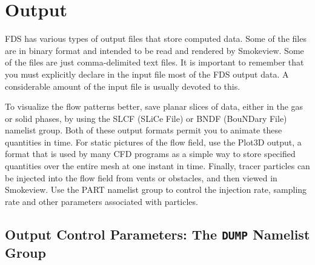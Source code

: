 \documentclass[11pt]{book}
\begin{document}




\chapter{Output}
\label{info:outputdata}

FDS has various types of output files that store computed data. Some of the files are in binary format and intended to be read and rendered by Smokeview. Some of the files are just comma-delimited text files. It is important to remember that you must explicitly declare in the input file most of the FDS output data. A considerable amount of the input file is usually devoted to this.

To visualize the flow patterns better, save planar slices of data, either in the gas or solid phases, by using the {\ct SLCF} (SLiCe File) or {\ct BNDF} (BouNDary File) namelist group. Both of these output formats permit you to animate these quantities in time. For static pictures of the flow field, use the Plot3D output, a format that is used by many CFD programs as a simple way to store specified quantities over the entire mesh at one instant in time. Finally, tracer particles can be injected into the flow field from vents or obstacles, and then viewed in Smokeview. Use the {\ct PART} namelist group to control the injection rate, sampling rate and other parameters associated with particles.


\section{Output Control Parameters: The \texorpdfstring{{\tt DUMP}}{DUMP} Namelist Group}
\label{info:DUMP}
\end{document}

